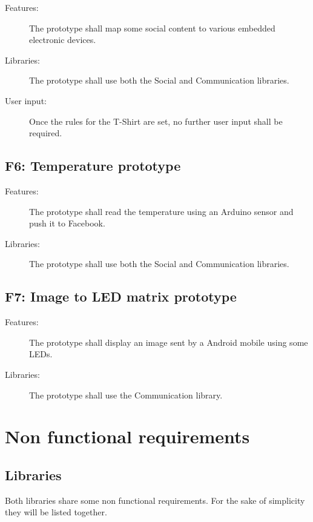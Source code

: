 	\begin{description}
		\item[Features:] The prototype shall map some social content
		to various embedded electronic devices.
		\item[Libraries:] The prototype shall use both the Social and
		Communication libraries.
		\item[User input:] Once the rules for the T-Shirt are set,
		no further user input shall be required.
	\end{description}

	\subsection{F6: Temperature prototype}
	\begin{description}
		\item[Features:] The prototype shall read the temperature
		using an Arduino sensor and push it to Facebook.
		\item[Libraries:] The prototype shall use both the Social and
		Communication libraries.
		\item[]
	\end{description}
	
	\subsection{F7: Image to LED matrix prototype}
	\begin{description}
		\item[Features:] The prototype shall display an image sent by a Android
		mobile using some LEDs.
		\item[Libraries:] The prototype shall use the Communication library.
		\item[]
	\end{description}



\section{Non functional requirements}

\subsection{Libraries}

Both libraries share some non functional requirements.
For the sake of simplicity they will be listed together.

